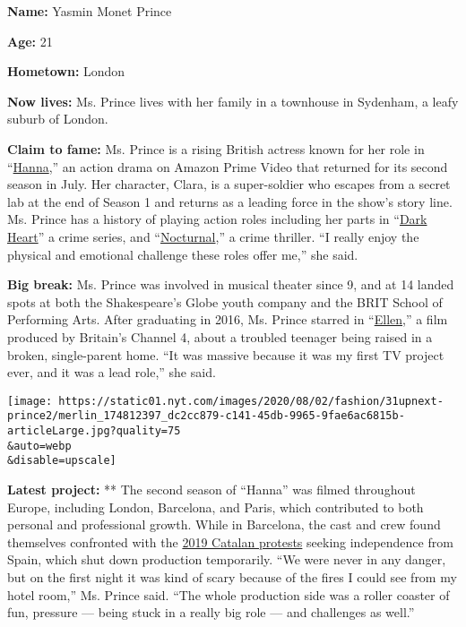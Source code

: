 \textbf{Name:} Yasmin Monet Prince

\textbf{Age:} 21

\textbf{Hometown:} London

\textbf{Now lives:} Ms. Prince lives with her family in a townhouse in
Sydenham, a leafy suburb of London.

\textbf{Claim to fame:} Ms. Prince is a rising British actress known for
her role in
``\href{https://www.amazon.com/Hanna-Season-2/dp/B087C8X5V2}{Hanna},''
an action drama on Amazon Prime Video that returned for its second
season in July. Her character, Clara, is a super-soldier who escapes
from a secret lab at the end of Season 1 and returns as a leading force
in the show's story line. Ms. Prince has a history of playing action
roles including her parts in
``\href{https://www.amazon.com/Dark-Heart-Season-1/dp/B07K2KH636}{Dark
Heart}'' a crime series, and
``\href{https://www.amazon.com/Nocturnal-Lashonda-Jones/dp/B07YX84F8M}{Nocturnal},''
a crime thriller. ``I really enjoy the physical and emotional challenge
these roles offer me,'' she said.

\textbf{Big break:} Ms. Prince was involved in musical theater since 9,
and at 14 landed spots at both the Shakespeare's Globe youth company and
the BRIT School of Performing Arts. After graduating in 2016, Ms. Prince
starred in ``\href{https://www.imdb.com/title/tt5959320/}{Ellen},'' a
film produced by Britain's Channel 4, about a troubled teenager being
raised in a broken, single-parent home. ``It was massive because it was
my first TV project ever, and it was a lead role,'' she said.

\texttt{[image: https://static01.nyt.com/images/2020/08/02/fashion/31upnext-prince2/merlin\_174812397\_dc2cc879-c141-45db-9965-9fae6ac6815b-articleLarge.jpg?quality=75\\\&auto=webp\\\&disable=upscale]}

\textbf{Latest project:} ** The second season of ``Hanna'' was filmed
throughout Europe, including London, Barcelona, and Paris, which
contributed to both personal and professional growth. While in
Barcelona, the cast and crew found themselves confronted with the
\href{https://www.nytimes.com/2019/09/11/world/europe/spain-catalonia-independence.html}{2019
Catalan protests} seeking independence from Spain, which shut down
production temporarily. ``We were never in any danger, but on the first
night it was kind of scary because of the fires I could see from my
hotel room,'' Ms. Prince said. ``The whole production side was a roller
coaster of fun, pressure --- being stuck in a really big role --- and
challenges as well.''

